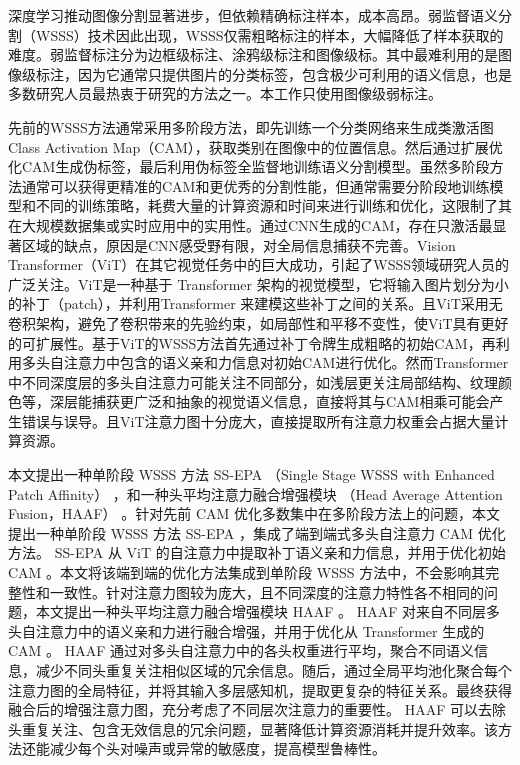 \begin{CJK*}{UTF8}{fs}
    深度学习推动图像分割显著进步，但依赖精确标注样本，成本高昂。弱监督语义分割（WSSS）技术因此出现，WSSS仅需粗略标注的样本，大幅降低了样本获取的难度。弱监督标注分为边框级标注\cite{39dai2015boxsup,40zhang2021affinity}、涂鸦级标注\cite{41lin2016scribblesup}和图像级标\cite{03ru2023token,12xu2022multi}。其中最难利用的是图像级标注，因为它通常只提供图片的分类标签，包含极少可利用的语义信息，也是多数研究人员最热衷于研究的方法之一。本工作只使用图像级弱标注。

	先前的WSSS方法通常采用多阶段方法，即先训练一个分类网络来生成类激活图Class Activation Map（CAM）\cite{01zhou2016learning}，获取类别在图像中的位置信息。然后通过扩展优化CAM生成伪标签，最后利用伪标签全监督地训练语义分割模型。虽然多阶段方法通常可以获得更精准的CAM和更优秀的分割性能，但通常需要分阶段地训练模型和不同的训练策略，耗费大量的计算资源和时间来进行训练和优化，这限制了其在大规模数据集或实时应用中的实用性。通过CNN生成的CAM，存在只激活最显著区域的缺点，原因是CNN感受野有限，对全局信息捕获不完善。Vision Transformer（ViT）\cite{02dosovitskiy2020image}在其它视觉任务中的巨大成功，引起了WSSS领域研究人员的广泛关注\cite{03ru2023token,12xu2022multi,13ru2022learning}。ViT是一种基于 Transformer 架构的视觉模型，它将输入图片划分为小的补丁（patch），并利用Transformer 来建模这些补丁之间的关系。且ViT采用无卷积架构，避免了卷积带来的先验约束，如局部性和平移不变性，使ViT具有更好的可扩展性。基于ViT的WSSS方法首先通过补丁令牌生成粗略的初始CAM，再利用多头自注意力中包含的语义亲和力信息对初始CAM进行优化\cite{12xu2022multi}。然而Transformer中不同深度层的多头自注意力可能关注不同部分，如浅层更关注局部结构、纹理颜色等，深层能捕获更广泛和抽象的视觉语义信息，直接将其与CAM相乘可能会产生错误与误导。且ViT注意力图十分庞大，直接提取所有注意力权重会占据大量计算资源。

	本文提出一种单阶段 WSSS 方法 SS-EPA （Single Stage WSSS with Enhanced Patch Affinity） ，和一种头平均注意力融合增强模块 （Head Average Attention Fusion，HAAF） 。针对先前 CAM 优化多数集中在多阶段方法上的问题，本文提出一种单阶段 WSSS 方法 SS-EPA ，集成了端到端式多头自注意力 CAM 优化方法。 SS-EPA 从 ViT 的自注意力中提取补丁语义亲和力信息，并用于优化初始 CAM 。本文将该端到端的优化方法集成到单阶段 WSSS 方法中，不会影响其完整性和一致性。针对注意力图较为庞大，且不同深度的注意力特性各不相同的问题，本文提出一种头平均注意力融合增强模块 HAAF 。 HAAF 对来自不同层多头自注意力中的语义亲和力进行融合增强，并用于优化从 Transformer 生成的 CAM 。 HAAF 通过对多头自注意力中的各头权重进行平均，聚合不同语义信息，减少不同头重复关注相似区域的冗余信息。随后，通过全局平均池化聚合每个注意力图的全局特征，并将其输入多层感知机，提取更复杂的特征关系。最终获得融合后的增强注意力图，充分考虑了不同层次注意力的重要性。 HAAF 可以去除头重复关注、包含无效信息的冗余问题，显著降低计算资源消耗并提升效率。该方法还能减少每个头对噪声或异常的敏感度，提高模型鲁棒性。


\end{CJK*}
